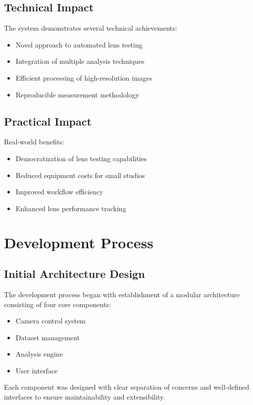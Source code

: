 \subsection{Technical Impact}
The system demonstrates several technical achievements:
\begin{itemize}
    \item Novel approach to automated lens testing
    \item Integration of multiple analysis techniques
    \item Efficient processing of high-resolution images
    \item Reproducible measurement methodology
\end{itemize}

\subsection{Practical Impact}
Real-world benefits:
\begin{itemize}
    \item Democratization of lens testing capabilities
    \item Reduced equipment costs for small studios
    \item Improved workflow efficiency
    \item Enhanced lens performance tracking
\end{itemize}

\section{Development Process}

\subsection{Initial Architecture Design}
The development process began with establishment of a modular architecture consisting of four core components:

\begin{itemize}
    \item Camera control system
    \item Dataset management
    \item Analysis engine
    \item User interface
\end{itemize}

Each component was designed with clear separation of concerns and well-defined interfaces to ensure maintainability and extensibility.

